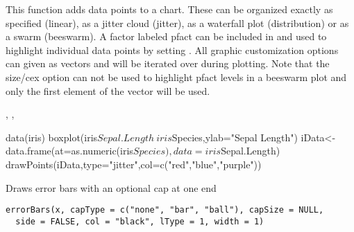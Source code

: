 \documentclass[a4paper]{book}
\begin{document}
%
\begin{Details}\relax
This function adds data points to a chart. These can be organized exactly as specified (linear), as a jitter cloud (jitter), as a waterfall plot (distribution) or as a swarm (beeswarm).
A factor labeled pfact can be included in  and used to highlight individual data points by setting . All graphic customization options can given as vectors and will be iterated over during plotting.
Note that the size/cex option can not be used to highlight pfact levels in a beeswarm plot and only the first element of the vector will be used.
\end{Details}
%
\begin{SeeAlso}\relax
{}, , 
\end{SeeAlso}
%
\begin{Examples}
\begin{ExampleCode}
data(iris)
boxplot(iris$Sepal.Length~iris$Species,ylab="Sepal Length")
iData<-data.frame(at=as.numeric(iris$Species),data=iris$Sepal.Length)
drawPoints(iData,type="jitter",col=c("red","blue","purple"))
\end{ExampleCode}
\end{Examples}
%
\begin{Description}\relax
Draws error bars with an optional cap at one end
\end{Description}
%
\begin{Usage}
\begin{verbatim}
errorBars(x, capType = c("none", "bar", "ball"), capSize = NULL,
  side = FALSE, col = "black", lType = 1, width = 1)
\end{verbatim}
\end{Usage}
%
\end{document}
